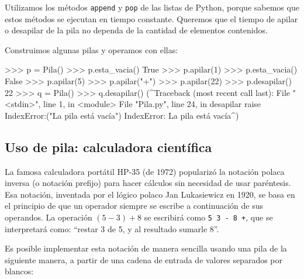 \begin{observacion}
Utilizamos los métodos \lstinline!append! y \lstinline!pop! de las listas de
Python, porque sabemos que estos métodos se ejecutan en tiempo constante.
Queremos que el tiempo de apilar o desapilar de la pila no dependa de la
cantidad de elementos contenidos.
\end{observacion}

Construimos algunas pilas y operamos con ellas:

\begin{codigo-python-sn}
>>> p = Pila()
>>> p.esta_vacia()
True
>>> p.apilar(1)
>>> p.esta_vacia()
False
>>> p.apilar(5)
>>> p.apilar("+")
>>> p.apilar(22)
>>> p.desapilar()
22
>>> q = Pila()
>>> q.desapilar()
(^Traceback (most recent call last):
  File "<stdin>", line 1, in <module>
  File "Pila.py", line 24, in desapilar
    raise IndexError:("La pila está vacía")
IndexError: La pila está vacía^)
\end{codigo-python-sn}

\subsection{Uso de pila: calculadora científica}

La famosa calculadora portátil HP-35 (de 1972) popularizó la notación
polaca inversa (o notación prefijo) para hacer cálculos sin necesidad de
usar paréntesis. Esa notación, inventada por el lógico polaco Jan
Lukasiewicz en 1920, se basa en el principio de que un operador siempre se
escribe a continuación de sus operandos. La operación $(5-3)+8$ se
escribirá como \lstinline|5 3 - 8 +|, que se interpretará como: \enquote{restar 3
de 5, y al resultado sumarle 8}.

Es posible implementar esta notación de manera sencilla usando una pila de
la siguiente manera, a partir de una cadena de entrada de valores separados
por blancos:

